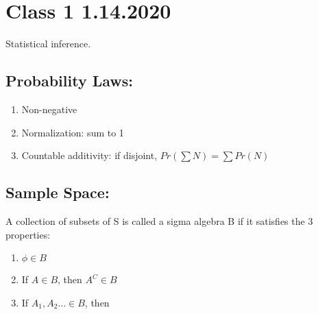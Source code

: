 \documentclass[11pt,letterpaper,titlepage]{article}
\begin{document}
\section{Class 1 1.14.2020}

Statistical inference.

\subsection{Probability Laws:}

\begin{enumerate}
    \item Non-negative
    
    \item Normalization: sum to 1
    
    \item Countable additivity: if disjoint, $Pr(\sum N)=\sum Pr(N)$
    
\end{enumerate}

\subsection{Sample Space:}

A collection of subsets of S is called a sigma algebra B if it satisfies the 3 properties:

\begin{enumerate}
    \item $\phi \in B$
    
    \item If $A \in B$, then $A^C \in B$
    
    \item If $A_1, A_2... \in B$, then $$
\end{enumerate}
\end{document}
